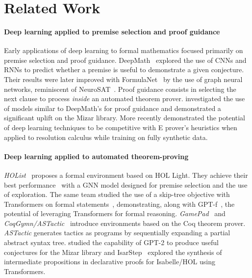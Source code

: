 \documentclass[nohyperref]{article}
\theoremstyle{plain}
\theoremstyle{definition}
\theoremstyle{remark}
\begin{document}



\newpage
\appendix
\onecolumn

\section{Related Work}
\label{appendix-related}

\paragraph{Deep learning applied to premise selection and proof guidance} Early applications of deep learning to formal mathematics focused primarily on premise selection and proof guidance. DeepMath~\cite{irving2016deepmath} explored the use of CNNs and RNNs to predict whether a premise is useful to demonstrate a given conjecture. Their results were later improved with FormulaNet~\cite{wang2017premise} by the use of graph neural networks, reminiscent of NeuroSAT~\cite{selsam2018learning}. Proof guidance consists in selecting the next clause to process \textit{inside} an automated theorem prover. \citet{loos2017deep} investigated the use of models similar to DeepMath's for proof guidance and demonstrated a significant uplift on the Mizar library. More recently \citet{firoiu2021training} demonstrated the potential of deep learning techniques to be competitive with E prover's heuristics when applied to resolution calculus while training on fully synthetic data.

\paragraph{Deep learning applied to automated theorem-proving} \textit{HOList}~\cite{bansal2019holist} proposes a formal environment based on HOL Light. They achieve their best performance~\cite{bansal2019learning} with a GNN model designed for premise selection and the use of exploration. The same team studied the use of a skip-tree objective with Transformers on formal statements~\cite{rabe2020language}, demonstrating, along with GPT-f~\cite{polu2020generative}, the potential of leveraging Transformers for formal reasoning. \textit{GamePad}~\cite{huang2018gamepad} and \textit{CoqGymn/ASTactic}~\cite{yang2019learning} introduce environments based on the Coq theorem prover. \textit{ASTactic} generates tactics as programs by sequentially expanding a partial abstract syntax tree. \citet{urban2020first} studied the capability of GPT-2 to produce useful conjectures for the Mizar library and IsarStep~\cite{li2020modelling} explored the synthesis of intermediate propositions in declarative proofs for Isabelle/HOL using Transformers. 
\end{document}
